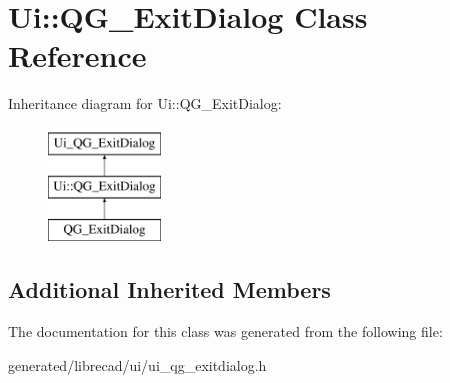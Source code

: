 \hypertarget{classUi_1_1QG__ExitDialog}{\section{Ui\-:\-:Q\-G\-\_\-\-Exit\-Dialog Class Reference}
\label{classUi_1_1QG__ExitDialog}
}
Inheritance diagram for Ui\-:\-:Q\-G\-\_\-\-Exit\-Dialog\-:\begin{figure}[H]
\begin{center}
\leavevmode
\includegraphics[height=3.000000cm]{classUi_1_1QG__ExitDialog}
\end{center}
\end{figure}
\subsection*{Additional Inherited Members}


The documentation for this class was generated from the following file\-:\begin{DoxyCompactItemize}
\item 
generated/librecad/ui/ui\-\_\-qg\-\_\-exitdialog.\-h\end{DoxyCompactItemize}
